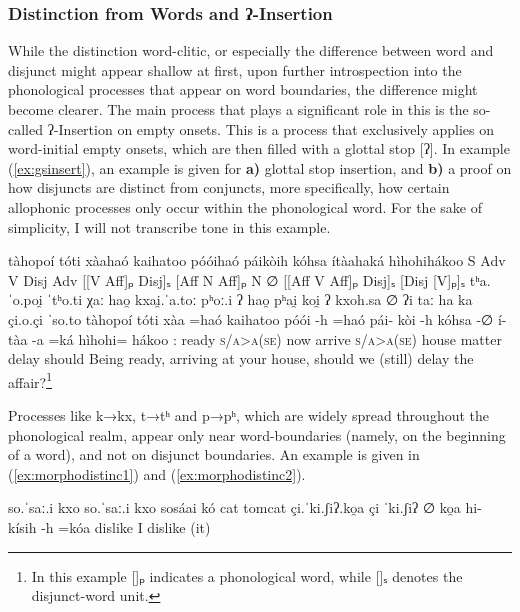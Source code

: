 \documentclass[a4paper, 12pt, oneside]{memoir}
\begin{document}
\subsubsection{Distinction from Words and ʔ-Insertion}\label{smorphonodistinc}
While the distinction word-clitic, or especially the difference between word and disjunct might appear shallow at first, upon further introspection into the phonological processes that appear on word boundaries, the difference might become clearer.
The main process that plays a significant role in this is the so-called ʔ-Insertion on empty onsets. This is a process that exclusively applies on word-initial empty onsets, which are then filled with a glottal stop [ʔ]. In example (\ref{ex:gsinsert}), an example is given for \textbf{a)} glottal stop insertion, and \textbf{b)} a proof on how disjuncts are distinct from conjuncts, more specifically, how certain allophonic processes only occur within the phonological word. For the sake of simplicity, I will not transcribe tone in this example.
\begin{examples}
\newbaarucmd[ans]{=}{\baarujuncture{\texttt{=}}}
    \ex \label{ex:gsinsert}
    \words tàhopoí tóti xàahaó kaihatoo póóihaó páikòih kóhsa ítàahaká hìhohihákoo
    \ans S Adv V Disj Adv [[V Aff]ₚ Disj]ₛ [Aff N Aff]ₚ N ∅ [[Aff V Aff]ₚ Disj]ₛ [Disj [V]ₚ]ₛ 
    \ipa tʰa.ˈo.poi̯ ˈtʰo.ti χaː hao̯ kxai̯.ˈa.toː pʰoː.i ʔ hao̯ pʰai̯ koi̯ ʔ kxoh.sa {∅} ʔi taː ha ka çi.o.çi ˈso.to
    \bits tàhopoí tóti xàa =haó kaihatoo póói -h =haó pái- kòi -h kóhsa -∅ í- tàa -a =ká hìhohi= hákoo
    \gloss {\Fas}:{\Agent} ready {\Cop} \textsc{s/a>a(se)} now arrive {\Ff} \textsc{s/a>a(se)} {\Sshposs} house {\Dat} matter {\Abs} {\Qu} {\Aux} {\Ff} {\Decl} delay should
    \tr Being ready, arriving at your house, should we (still) delay the affair?\footnote{In this example []ₚ indicates a phonological word, while []ₛ denotes the disjunct-word unit.}
\end{examples}
Processes like k→kx, t→tʰ and p→pʰ, which are widely spread throughout the phonological realm, appear only near word-boundaries (namely, on the beginning of a word), and not on disjunct boundaries. An example is given in (\ref{ex:morphodistinc1}) and (\ref{ex:morphodistinc2}).
\begin{examples}
    \ex \label{ex:morphodistinc1}
    \script so.ˈsaː.i kxo
    \ipa so.ˈsaː.i kxo
    \bits sosáai kó
    \gloss cat {\Tsm}
    \tr tomcat
    \ex \label{ex:morphodistinc2}
    \script çi.ˈki.ʃiʔ.ko̯a
    \ipa çi ˈki.ʃiʔ ∅ ko̯a
    \bits hi- kísih -h =kóa
    \gloss {\Antip} dislike {\Ff} {\Decl} 
    \tr I dislike (it)
\end{examples}
\end{document}
